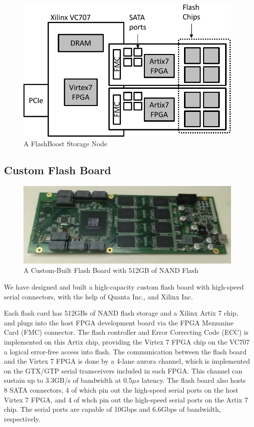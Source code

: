 \begin{figure}[ht]
	\begin{center}
	\includegraphics[width=0.4\paperwidth]{figures/storagenode-crop.pdf}
	\caption{A FlashBoost Storage Node}
	\label{fig:bluedbmnode}
	\end{center}
\end{figure}


\subsection{Custom Flash Board}

\begin{figure}[ht]
	\begin{center}
	\includegraphics[width=0.4\paperwidth]{figures/flashboard.jpg}
	\caption{A Custom-Built Flash Board with 512GB of NAND Flash}
	\label{fig:flashboard}
	\end{center}
\end{figure}

We have designed and built a high-capacity custom flash board with high-speed
serial connectors, with the help of Quanta Inc., and Xilinx Inc.

Each flash card has 512GBs of NAND flash storage and a Xilinx Artix 7 chip, and
plugs into the host FPGA development board via the FPGA Mezzanine Card (FMC)
connector. The flash controller and Error Correcting Code (ECC) is implemented
on this Artix chip, providing the Virtex 7 FPGA chip on the VC707 a logical
error-free access into flash. The communication between the flash board and the
Virtex 7 FPGA is done by a 4-lane aurora channel, which is implemented on the
GTX/GTP serial transceivers included in each FPGA. This channel can sustain up
to 3.3GB/s of bandwidth at 0.5$\mu s$ latency.
The flash board also hosts 8 SATA connectors, 4 of
which pin out the high-speed serial ports on the host Virtex 7 FPGA,
and 4 of whch pin out the high-speed serial ports on the Artix 7 chip.
The serial ports are capable of 10Gbps and 6.6Gbps of bandwidth, respectively.
